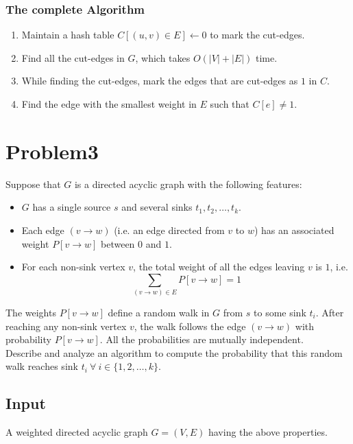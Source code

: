 \documentclass[12pt]{report}
\begin{document}
    \subsubsection*{The complete Algorithm}
    \begin{enumerate}
        \item Maintain a hash table $C[(u, v) \in E] \gets 0$ to mark the cut-edges.
        \item Find all the cut-edges in $G$, which takes $O(|V| + |E|)$ time.
        \item While finding the cut-edges, mark the edges that are cut-edges as $1$ in $C$.
        \item Find the edge with the smallest weight in $E$ such that $C[e] \neq 1$.
    \end{enumerate}

    \pagebreak

    \section*{\huge{Problem3}}
    Suppose that $G$ is a directed acyclic graph with the following features:
    \begin{itemize}
        \item $G$ has a single source $s$ and several sinks $t_{1}, t_{2}, \dots, t_{k}$.
        \item Each edge $(v \to w)$ (i.e. an edge directed from $v$ to $w$) has an associated weight $P[v \to w]$ between $0$ and $1$.
        \item For each non-sink vertex $v$, the total weight of all the edges leaving $v$ is $1$, i.e.
        \begin{equation}
            \label{eq:total_weight}
            \sum_{(v \to w) \in E} P[v \to w] = 1
        \end{equation}
    \end{itemize}
    The weights $P[v \to w]$ define a random walk in $G$ from $s$ to some sink $t_{i}$.
    After reaching any non-sink vertex $v$, the walk follows the edge $(v \to w)$ with probability $P[v \to w]$.
    All the probabilities are mutually independent. \\
    Describe and analyze an algorithm to compute the probability that this random walk reaches sink
    $t_{i} \ \forall \ i \in \{ 1, 2, \dots, k \}$.

    \subsection*{Input}
    A weighted directed acyclic graph $G = (V, E)$ having the above properties.
\end{document}
